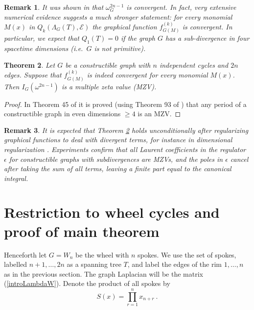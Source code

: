 \documentclass[10pt]{amsart}
\newcommand{\sE}{\mathcal{E}}
\theoremstyle{plain}
\newtheorem{thm}{Theorem}
\newtheorem{remark}[thm]{Remark}
\newcommand{\0}{\color{blue}{\mathsf{0}}}
\begin{document}
\begin{remark}
It was shown in \cite{BrSigma} that $\omega_G^{2n-1}$ is convergent. In fact,  very extensive numerical evidence suggests  a much stronger statement:   for every  monomial 
$M(x)$ in $Q_k(\Lambda_G(T),\sE)$ the  graphical function $f_{G(M)}^{(k)}$  is convergent.  In particular, we expect that $Q_1(T)=0$ if the graph $G$ has a sub-divergence
in four spacetime dimensions (i.e.\ $G$ is not primitive). 
\end{remark}

\begin{thm}\label{contructthm} Let $G$ be a \emph{constructible} graph with $n$ independent cycles and $2n$ edges.
Suppose that $f_{G(M)}^{(k)}$  is indeed  convergent  for every monomial $M(x)$.
 Then
$I_G(\omega^{2n-1})$ is a multiple zeta value (MZV). 
\end{thm}
\begin{proof}
In Theorem 45 of \cite{BorinskySchnetz} it is proved (using Theorem 93 of \cite{schnetz2021generalized}) that any period of a constructible graph in even dimensions $\geq4$ is an MZV.
\end{proof}

\begin{remark}
It is expected that Theorem \ref{contructthm} holds unconditionally after regularizing 
graphical functions to deal with divergent terms, for instance in  dimensional regularization \cite{Schnetznumfunct,7loops}.  Experiments confirm that
all Laurent coefficients in the regulator $\epsilon$  for constructible graphs with subdivergences are MZVs, and   the poles in $\epsilon$ cancel after taking the sum of all terms, leaving a finite part  equal to  the canonical integral.
\end{remark}

\section{Restriction to wheel cycles and proof of main theorem} \label{sec8}
Henceforth let $G=W_n$ be the  wheel with $n$ spokes.  We use the set of  spokes, labelled $n+1,\ldots, 2n$ as a spanning tree $T$, and  label the edges of the rim  $1,\ldots,n$ as in the previous section. The graph Laplacian will be the matrix (\ref{introLambdaW}).  Denote  the product of all spokes by
\begin{equation}\label{Sdef}
S(x)=\prod_{r=1}^nx_{n+r}\ .
\end{equation}
\end{document}
